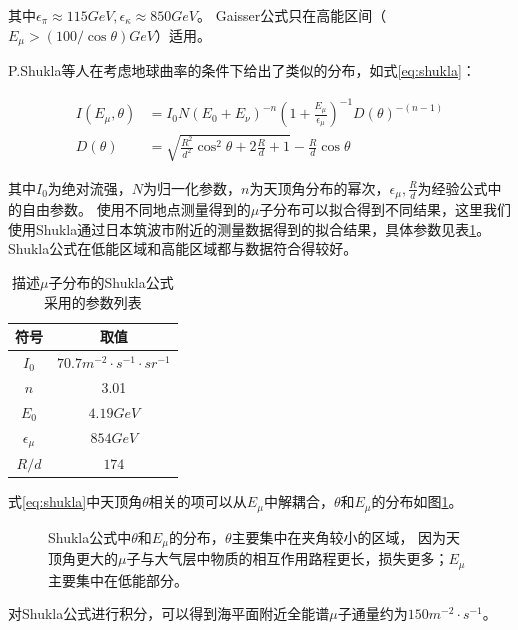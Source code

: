 其中$\epsilon_\pi\approx115\si{GeV},\epsilon_\kappa\approx850\si{GeV}$。
Gaisser公式只在高能区间（$E_\mu>(100/\cos\theta)\si{GeV}$）适用。

P.Shukla等人在考虑地球曲率的条件下给出了类似的分布\cite{shukla_energy_2018}，如式\ref{eq:shukla}：

\begin{align}
    \label{eq:shukla}
    I\left(E_\mu,\theta\right) &= I_0 N\left(E_0+E_\nu\right)^{-n}\left(1 + \frac{E_\mu}{\epsilon_\mu}\right)^{-1}D(\theta)^{-(n-1)} \\
    D(\theta) &= \sqrt{\frac{R^2}{d^2}\cos^2\theta+2\frac{R}{d}+1}-\frac{R}{d}\cos\theta
\end{align}

其中$I_0$为绝对流强，$N$为归一化参数，$n$为天顶角分布的幂次，$\epsilon_\mu,\frac{R}{d}$为经验公式中的自由参数。
使用不同地点测量得到的$\mu$子分布可以拟合得到不同结果，这里我们使用Shukla通过日本筑波市附近的测量数据得到的拟合结果，具体参数见表\ref{tab:shukla}。
Shukla公式在低能区域和高能区域都与数据符合得较好。

\begin{table}
  \centering
  \caption{描述$\mu$子分布的Shukla公式采用的参数列表}
  \begin{tabular}{cc}
    \toprule
    符号 & 取值 \\
    \midrule
    $I_0$ & $70.7\si{m^{-2}\cdot s^{-1}\cdot sr^{-1}}$ \\
    $n$ & 3.01 \\
    $E_0$ & $4.19\si{GeV}$ \\
    $\epsilon_\mu$ & $854\si{GeV}$ \\
    $R/d$ & $174$ \\
    \bottomrule
  \end{tabular}
  \label{tab:shukla}
\end{table}

式\ref{eq:shukla}中天顶角$\theta$相关的项可以从$E_\mu$中解耦合，$\theta$和$E_\mu$的分布如图\ref{fig:shukla_distribution}。

\begin{figure}
    \centering
    
    \caption{\label{fig:shukla_distribution} Shukla公式中$\theta$和$E_\mu$的分布，$\theta$主要集中在夹角较小的区域，
    因为天顶角更大的$\mu$子与大气层中物质的相互作用路程更长，损失更多；$E_\mu$主要集中在低能部分。}
\end{figure}

对Shukla公式进行积分，可以得到海平面附近全能谱$\mu$子通量约为$150\si{m^{-2}\cdot s^{-1}}$。

